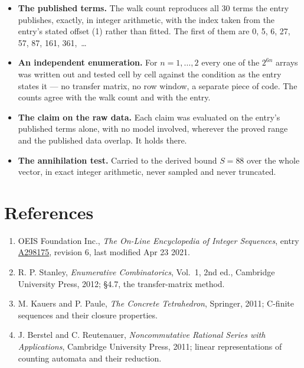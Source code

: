 \documentclass[11pt]{article}
\theoremstyle{definition}
\begin{document}
\begin{itemize}

\item {\bfseries The published terms.} The walk count reproduces all 30 terms the entry publishes, exactly, in integer arithmetic, with the index taken from the entry's stated offset (1) rather than fitted. The first of them are 0, 5, 6, 27, 57, 87, 161, 361,~\dots

\item {\bfseries An independent enumeration.} For $n = 1,\dots,2$ every one of the $2^{6n}$ arrays was written out and tested cell by cell against the condition as the entry states it --- no transfer matrix, no row window, a separate piece of code. The counts agree with the walk count and with the entry.

\item {\bfseries The claim on the raw data.} Each claim was evaluated on the entry's published terms alone, with no model involved, wherever the proved range and the published data overlap. It holds there.

\item {\bfseries The annihilation test.} Carried to the derived bound $S = 88$ over the whole vector, in exact integer arithmetic, never sampled and never truncated.

\end{itemize}

\section{References}

\begin{enumerate}

\item OEIS Foundation Inc., \emph{The On-Line Encyclopedia of Integer Sequences}, entry \href{https://oeis.org/A298175}{A298175}, revision 6, last modified Apr 23 2021.

\item R. P. Stanley, \emph{Enumerative Combinatorics}, Vol.~1, 2nd ed., Cambridge University Press, 2012; \S4.7, the transfer-matrix method.

\item M. Kauers and P. Paule, \emph{The Concrete Tetrahedron}, Springer, 2011; C-finite sequences and their closure properties.

\item J. Berstel and C. Reutenauer, \emph{Noncommutative Rational Series with Applications}, Cambridge University Press, 2011; linear representations of counting automata and their reduction.

\end{enumerate}
\end{document}

